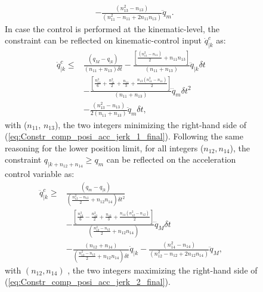 \begin{figure}[!htbp]
\begin{equation}
\begin{split}
& - \frac{\left(n_{13}^2-n_{13}\right)}{\left(n_{11}^2 - n_{11} + 2 n_{11} n_{13}\right)}  \ddot{q}_m. 
\label{eq:Constr_comp_posi_acc_jerk_1_final}
\end{split}
\end{equation}
In case the control is performed at the kinematic-level, the constraint can be reflected on kinematic-control input $\dot{q}_{|k}^{c}$ as: 
\begin{equation}
\begin{split}
\dot{q}_{|k}^{c}  \leq &\frac{\left(q_M - q_{|k}\right)}{\left(n_{11} + n_{13}\right) \delta t}  -\frac{\left[\frac{\left(n_{11}^2-n_{11}\right)}{2} + n_{11} n_{13}\right]}{\left(n_{11} + n_{13}\right)}  \ddot{q}_{|k} \delta t\\ 
& - \frac{\left[\frac{n_{11}^3}{6} + \frac{n_{11}^2}{2} + \frac{n_{11}}{3} + \frac{n_{13} \left(n_{11}^2 - n_{11}\right)}{2}\right]}{\left(n_{11} + n_{13}\right)} \dddot{q}_m \delta t^2 \\
& - \frac{\left(n_{13}^2-n_{13}\right)}{2\left(n_{11} + n_{13}\right)} \ddot{q}_m \delta t, 
\label{eq:Constr_comp_posi_acc_jerk_1_kinema_final}
\end{split}
\end{equation}
with ($n_{11}$, $n_{13}$), the two integers minimizing the right-hand side of (\ref{eq:Constr_comp_posi_acc_jerk_1_final}).
Following the same reasoning for the lower position limit,  for all integers ($n_{12}, n_{14}$), the constraint $q_{|k+n_{12}+n_{14}} \geq q_m$ can be reflected on the acceleration control variable as: 
\begin{equation}
\begin{split}
\ddot{q}_{|k}^{c}  \geq &\frac{\left(q_m - q_{|k}\right)}{\left(\frac{n_{12}^2 - n_{12}}{2} + n_{12} n_{14}\right)\delta t^2} \\ 
& -\frac{\left[\frac{n_{12}^3}{6} - \frac{n_{12}^2}{2} + \frac{n_{12}}{3} + \frac{n_{14}\left(n_{12}^2-n_{12}\right)}{2}\right]}{\left(\frac{n_{12}^2 - n_{12}}{2} + n_{12} n_{14}\right)} \dddot{q}_M \delta t \\
& - \frac{\left(n_{12}+n_{14}\right)}{\left(\frac{n_{12}^2 - n_{12}}{2} + n_{12} n_{14}\right) \delta t} \dot{q}_{|k} - \frac{\left(n_{14}^2-n_{14}\right)}{\left(n_{12}^2 - n_{12} + 2 n_{12} n_{14}\right)}  \ddot{q}_M, 
\label{eq:Constr_comp_posi_acc_jerk_2_final}
\end{split}
\end{equation}
with $(n_{12}, n_{14})$ , the two integers maximizing the right-hand side of (\ref{eq:Constr_comp_posi_acc_jerk_2_final}). \\

\end{figure}
